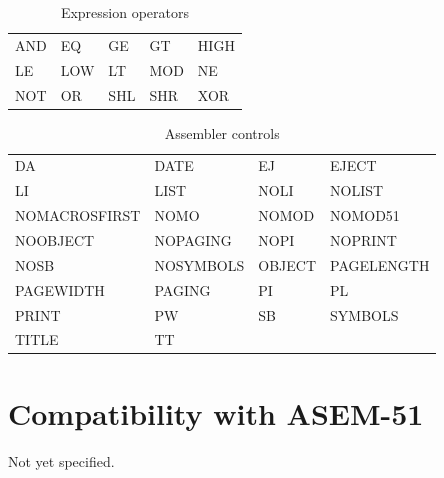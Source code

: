 \documentclass[a4paper,twoside,12pt]{book}
\newcommand{\mysmallfont}{\fontsize{8pt}{10pt} \selectfont{}}
\begin{document}
		\begin{table}[h!]
			\centering{}
			\mysmallfont{}
			\caption{Expression operators}
			\begin{tabular}{|lllll|}
				\hline
				AND	& EQ	& GE	& GT	& HIGH	\\
				LE	& LOW	& LT	& MOD	& NE	\\
				NOT	& OR	& SHL	& SHR	& XOR	\\
				\hline
			\end{tabular}
		\end{table}
		\begin{table}[h!]
			\centering{}
			\mysmallfont{}
			\caption{Assembler controls}
			\begin{tabular}{|llll|}
				\hline
				DA		& DATE		& EJ		& EJECT		\\
				LI		& LIST		& NOLI		& NOLIST	\\
				NOMACROSFIRST	& NOMO		& NOMOD		& NOMOD51	\\
				NOOBJECT	& NOPAGING	& NOPI		& NOPRINT	\\
				NOSB		& NOSYMBOLS	& OBJECT	& PAGELENGTH	\\
				PAGEWIDTH	& PAGING	& PI		& PL		\\
				PRINT		& PW		& SB		& SYMBOLS	\\
				TITLE		& TT		&		&		\\
				\hline
			\end{tabular}
		\end{table}

	\clearpage
	\section{Compatibility with ASEM-51}
		Not yet specified.

	\clearpage
\end{document}

